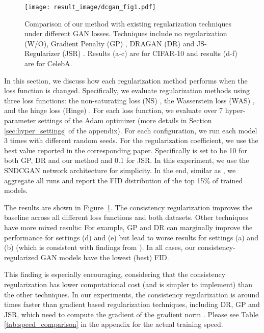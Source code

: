 \documentclass{article} \usepackage{iclr2020_conference,times}
\begin{document}
\begin{figure}[t]
    \centering
    \texttt{[image: result\_image/dcgan\_fig1.pdf]}
    \caption{
    Comparison of our method with existing regularization techniques under different GAN losses.
    Techniques include no regularization (W/O), Gradient Penalty (GP) \citep{WGANGP}, DRAGAN (DR) \citep{kodali2017convergence} and JS-Regularizer (JSR) \citep{RothLNH17}.
    Results (a-c) are for CIFAR-10 and results (d-f) are for CelebA.  
    }
    \label{fig:loss_fn}
\end{figure}
In this section, we discuss how each regularization method performs when the loss function is changed. 
Specifically, we evaluate regularization methods using three loss functions: 
the non-saturating loss (NS) \citep{goodfellow2014generative},
the Wasserstein loss (WAS) \citep{WGAN}, and 
the hinge loss (Hinge) \citep{lim2017, Tran2017}.
For each loss function, we evaluate over 7 hyper-parameter settings of the Adam optimizer 
(more details in Section \ref{sec:hyper_settings} of the appendix). 
For each configuration, we run each model 3 times with different random seeds.
For the regularization coefficient, we use the best value reported in the corresponding paper.
Specifically  is set to be 10 for both GP, DR and our method and 0.1 for JSR.
In this experiment, we use the SNDCGAN network architecture \citep{Miyato18a} for simplicity.
In the end, similar as \citet{compare_gan},  we aggregate all runs and report the FID distribution of the top 15\% of trained models.

The results are shown in Figure~\ref{fig:loss_fn}. The consistency regularization improves the baseline across all different loss functions and both datasets. 
Other techniques have more mixed results:
For example, GP and DR can marginally improve the performance for settings (d) and (e) but lead to worse results for settings (a) and (b) (which is consistent with findings from \citet{compare_gan}). 
In all cases, our consistency-regularized GAN models have the lowest (best) FID. 

This finding is especially encouraging, considering that the consistency regularization has lower computational cost (and is simpler to implement) than the other techniques. In our experiments, the consistency regularization is around  times faster than gradient based regularization techniques, including DR, GP and JSR, which need to compute the gradient of the gradient norm . Please see Table \ref{tab:speed_comparison} in the appendix for the actual training speed. 
\end{document}
